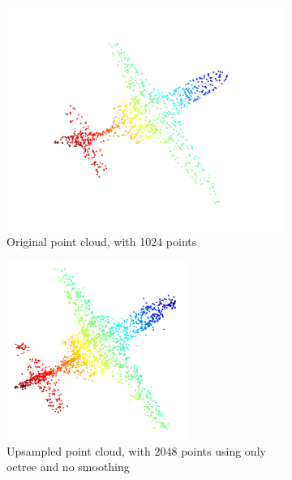 \begin{figure}[!ht]
	\centering
	\begin{subfigure}{0.3\textwidth}
		\centering
		\includegraphics[width=\textwidth]{1024_no_upsampling.png}
		\caption{Original point cloud, with 1024 points}
	\end{subfigure}
	\begin{subfigure}{0.3\textwidth}
		\centering
		\includegraphics[width=0.65\textwidth]{./2048_octree_no_smoothing.png}
		\caption{Upsampled point cloud, with 2048 points using only octree and no smoothing}
	\end{subfigure}
	\begin{subfigure}{0.3\textwidth}
		\centering

\end{subfigure}
\end{figure}

